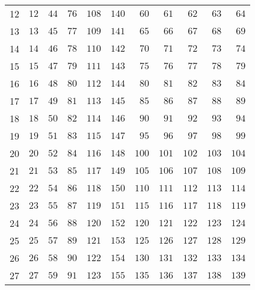 \begin{table}[H]
\begin{tabular}{r|rrrrr|rrrrr}
        12 & $12$     & $44$     & $76$     & $108$    & $140$    & $60$     & $61$     & $62$     & $63$     & $64$     \\
        13 & $13$     & $45$     & $77$     & $109$    & $141$    & $65$     & $66$     & $67$     & $68$     & $69$     \\
        14 & $14$     & $46$     & $78$     & $110$    & $142$    & $70$     & $71$     & $72$     & $73$     & $74$     \\
        15 & $15$     & $47$     & $79$     & $111$    & $143$    & $75$     & $76$     & $77$     & $78$     & $79$     \\
        16 & $16$     & $48$     & $80$     & $112$    & $144$    & $80$     & $81$     & $82$     & $83$     & $84$     \\
        17 & $17$     & $49$     & $81$     & $113$    & $145$    & $85$     & $86$     & $87$     & $88$     & $89$     \\
        18 & $18$     & $50$     & $82$     & $114$    & $146$    & $90$     & $91$     & $92$     & $93$     & $94$     \\
        19 & $19$     & $51$     & $83$     & $115$    & $147$    & $95$     & $96$     & $97$     & $98$     & $99$     \\
        20 & $20$     & $52$     & $84$     & $116$    & $148$    & $100$    & $101$    & $102$    & $103$    & $104$    \\
        21 & $21$     & $53$     & $85$     & $117$    & $149$    & $105$    & $106$    & $107$    & $108$    & $109$    \\
        22 & $22$     & $54$     & $86$     & $118$    & $150$    & $110$    & $111$    & $112$    & $113$    & $114$    \\
        23 & $23$     & $55$     & $87$     & $119$    & $151$    & $115$    & $116$    & $117$    & $118$    & $119$    \\
        24 & $24$     & $56$     & $88$     & $120$    & $152$    & $120$    & $121$    & $122$    & $123$    & $124$    \\
        25 & $25$     & $57$     & $89$     & $121$    & $153$    & $125$    & $126$    & $127$    & $128$    & $129$    \\
        26 & $26$     & $58$     & $90$     & $122$    & $154$    & $130$    & $131$    & $132$    & $133$    & $134$    \\
        27 & $27$     & $59$     & $91$     & $123$    & $155$    & $135$    & $136$    & $137$    & $138$    & $139$    \\

\end{tabular}
\end{table}
